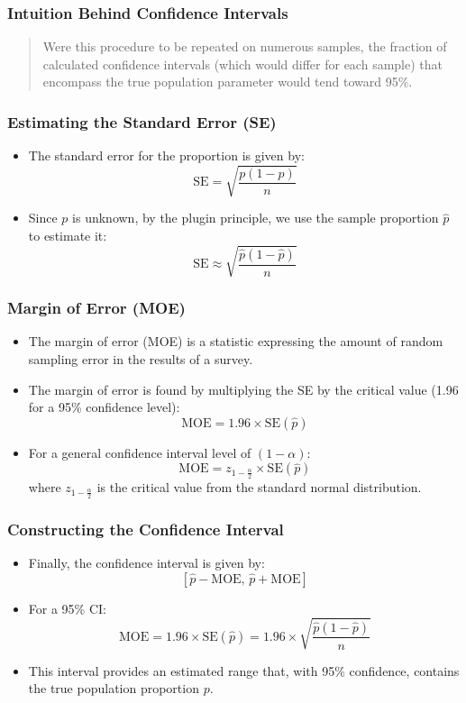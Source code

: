 \documentclass[handout]{beamer} %
\begin{document}
\begin{frame}
    \frametitle{Intuition Behind Confidence Intervals}
    \begin{quote}
        Were this procedure to be repeated on numerous samples, the fraction of calculated confidence intervals (which would differ for each sample) that encompass the true population parameter would tend toward 95\%.
    \end{quote}
\end{frame}



\begin{frame}
    \frametitle{Estimating the Standard Error (SE)}
    \begin{itemize}
        \item The standard error for the proportion is given by:
        \[
        \text{SE} = \sqrt{\frac{p(1-p)}{n}}
        \]
        \item Since \( p \) is unknown, by the plugin principle, we use the sample proportion \( \hat{p} \) to estimate it:
        \[
        \text{SE} \approx \sqrt{\frac{\hat{p}(1-\hat{p})}{n}}
        \]
    \end{itemize}
\end{frame}

\begin{frame}
    \frametitle{Margin of Error (MOE)}
    \begin{itemize}
        \item The margin of error (MOE) is a statistic expressing the amount of random sampling error in the results of a survey.
        \item The margin of error is found by multiplying the SE by the critical value (1.96 for a 95\% confidence level):
        \[
            \text{MOE} = 1.96 \times \text{SE}(\hat{p})
        \]
        \item For a general confidence interval level of $(1-\alpha)$:
        \[
            \text{MOE} = z_{1-\frac{\alpha}{2}} \times \text{SE}(\hat{p})
        \]
        where $z_{1-\frac{\alpha}{2}}$ is the critical value from the standard normal distribution.
    \end{itemize}
\end{frame}


\begin{frame}
    \frametitle{Constructing the Confidence Interval}
    \begin{itemize}
        \item Finally, the confidence interval is given by:
    \[
    \left[\hat{p} - \text{MOE}, \, \hat{p} + \text{MOE}\right]
    \]
    \item For a 95\% CI:
       \[
    \text{MOE} = 1.96 \times \text{SE}(\hat{p}) = 1.96 \times \sqrt{\frac{\hat{p}(1-\hat{p})}{n}}
    \]
        \item This interval provides an estimated range that, with 95\% confidence, contains the true population proportion \( p \).
    \end{itemize}
\end{frame}
\end{document}
